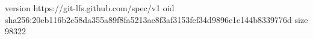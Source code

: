 version https://git-lfs.github.com/spec/v1
oid sha256:20eb116b2c58da355a89f8fa5213ac8f3af3153fef34d9896e1e144b8339776d
size 98322
